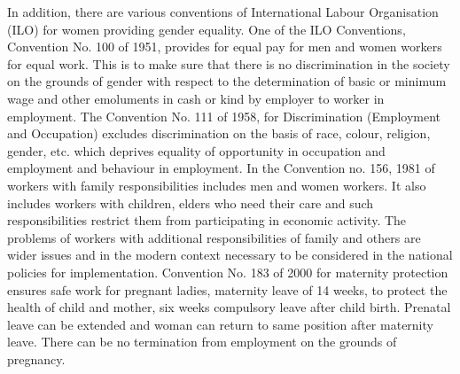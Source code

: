 \begin{multicols}{2}
\noi
In addition, there are various conventions of International Labour Organisation (ILO) for
women providing gender equality. One of the ILO Conventions, Convention No. 100 of
1951, provides for equal pay for men and women workers for equal work. This is to make
sure that there is no discrimination in the society on the grounds of gender with respect to the
determination of basic or minimum wage and other emoluments in cash or kind by employer
to worker in employment. The Convention No. 111 of 1958, for Discrimination (Employment
and Occupation) excludes discrimination on the basis of race, colour, religion, gender, etc.
which deprives equality of opportunity in occupation and employment and behaviour in
employment. In the Convention no. 156, 1981 of workers with family responsibilities
includes men and women workers. It also includes workers with children, elders who need
their care and such responsibilities restrict them from participating in economic activity. The
problems of workers with additional responsibilities of family and others are wider issues and
in the modern context necessary to be considered in the national policies for implementation.
Convention No. 183 of 2000 for maternity protection ensures safe work for pregnant ladies,
maternity leave of 14 weeks, to protect the health of child and mother, six weeks compulsory
leave after child birth. Prenatal leave can be extended and woman can return to same position
after maternity leave. There can be no termination from employment on the grounds of
pregnancy.


\end{multicols}
